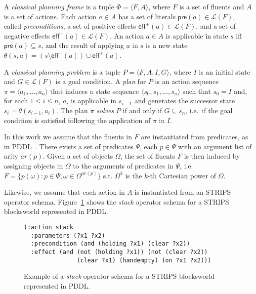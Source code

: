 \documentclass[letterpaper]{article} %
\newcommand{\tup}[1]{{\langle #1 \rangle}}
\newcommand{\pre}{\mathsf{pre}}     %
\newcommand{\eff}{\mathsf{eff}}     %
\begin{document}
A {\em classical planning frame} is a tuple $\Phi=\tup{F,A}$, where $F$ is a set of fluents and $A$ is a set of actions. Each action $a\in A$ has a set of literals $\pre(a)\in\mathcal{L}(F)$, called {\em preconditions}, a set of positive effects $\eff^+(a)\in\mathcal{L}(F)$, and a set of negative effects $\eff^-(a)\in\mathcal{L}(F)$. An action $a\in A$ is applicable in state $s$ iff $\pre(a)\subseteq s$, and the result of applying $a$ in $s$ is a new state $\theta(s,a)=(s\setminus \eff^-(a))\cup\eff^+(a)$.

A {\em classical planning problem} is a tuple $P=\tup{F,A,I,G}$, where $I$ is an initial state and $G\in\mathcal{L}(F)$ is a goal condition. A {\em plan} for $P$ is an action sequence $\pi=\tup{a_1, \ldots, a_n}$ that induces a state sequence $\tup{s_0, s_1, \ldots, s_n}$ such that $s_0=I$ and, for each {\small $1\leq i\leq n$}, $a_i$ is applicable in $s_{i-1}$ and generates the successor state $s_i=\theta(s_{i-1},a_i)$. The plan $\pi$ {\em solves} $P$ if and only if $G\subseteq s_n$, i.e.~if the goal condition is satisfied following the application of $\pi$ in $I$.

In this work we assume that the fluents in $F$ are instantiated from predicates, as in PDDL~\cite{mcdermott1998pddl,fox2003pddl2}. There exists a set of predicates $\Psi$, each $p\in\Psi$ with an argument list of arity $ar(p)$. Given a set of objects $\Omega$, the set of fluents $F$ is then induced by assigning objects in $\Omega$ to the arguments of predicates in $\Psi$, i.e.~$F=\{p(\omega):p\in\Psi,\omega\in\Omega^{ar(p)}\}$ s.t. $\Omega^k$ is the $k$-th Cartesian power of $\Omega$.

Likewise, we assume that each action in $A$ is instantiated from an STRIPS operator schema. Figure~\ref{fig:stack} shows the {\em stack} operator schema for a STRIPS blocksworld represented in PDDL.
\begin{figure}[hbt]
\begin{footnotesize}
\begin{scriptsize}
\begin{verbatim}
(:action stack
  :parameters (?x1 ?x2)
  :precondition (and (holding ?x1) (clear ?x2))
  :effect (and (not (holding ?x1)) (not (clear ?x2))
               (clear ?x1) (handempty) (on ?x1 ?x2)))
\end{verbatim}
\end{scriptsize}
\end{footnotesize}
 \caption{\small Example of a {\em stack} operator schema for a STRIPS blocksworld represented in PDDL.}
\label{fig:stack}
\end{figure}
\end{document}
